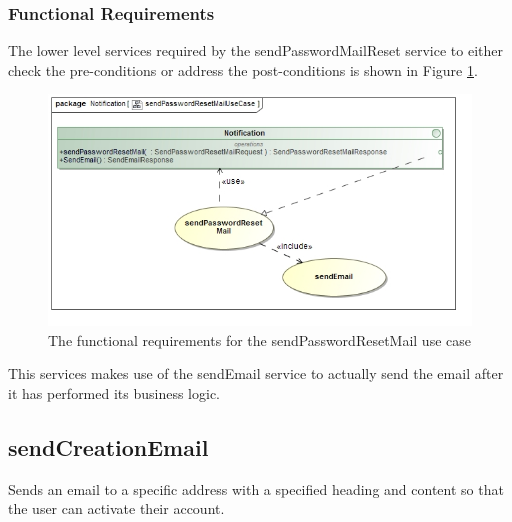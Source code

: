 \subsubsection{Functional Requirements}
The lower level services required by the sendPasswordMailReset service to either check the
pre-conditions or address the post-conditions is shown in Figure
\ref{sendPasswordMailFunctionalRequirements}.
\begin{figure}[H]
	\begin{center}
		\includegraphics[scale=0.7]{../Diagrams and Charts/Notifications/sendPasswordResetMailUseCase.jpg}
		\caption{The functional requirements for the sendPasswordResetMail use case}
	\end{center}
	\label{sendPasswordMailFunctionalRequirements}
\end{figure}

This services makes use of the sendEmail service to actually send the email after
it has performed its business logic.

\subsection{sendCreationEmail}
Sends an email to a specific address with a specified heading and content
so that the user can activate their account.

